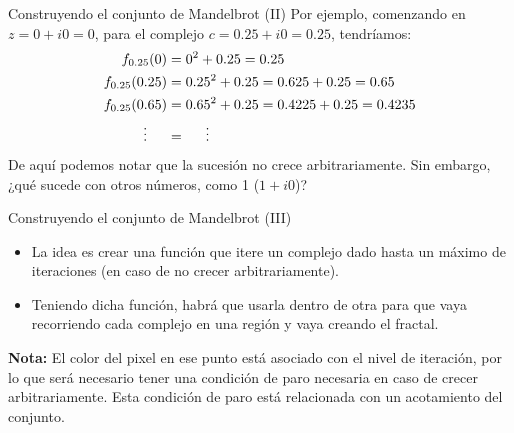 \documentclass[usenames,dvipsnames]{beamer}
\begin{document}
  \begin{frame}{Construyendo el conjunto de Mandelbrot (II)}
    Por ejemplo, comenzando en $z = 0 + i0 = 0$, para el complejo
    $c = 0.25 + i0 = 0.25$, tendríamos:
    \begin{align*}
    f_{0.25}(0) &=  0^2 + 0.25 = 0.25\\
    f_{0.25}(0.25) &=  0.25^2 + 0.25 = 0.625 + 0.25 = 0.65\\
    f_{0.25}(0.65) &=  0.65^2 + 0.25 = 0.4225 + 0.25 = 0.4235\\
    \vdots\hspace*{0.5cm} &= \hspace*{0.5cm}\vdots
    \end{align*}
    De aquí podemos notar que la sucesión no crece arbitrariamente.
    Sin embargo, ¿qué sucede con otros números, como 1 ($1 + i0$)?
  \end{frame}

  \begin{frame}{Construyendo el conjunto de Mandelbrot (III)}
    \begin{itemize}
      \item La idea es crear una función que itere un complejo dado hasta
      un máximo de iteraciones (en caso de no crecer arbitrariamente).\\
      \item Teniendo dicha función, habrá que usarla dentro de otra para que
      vaya recorriendo cada complejo en una región y vaya creando el fractal.\\
    \end{itemize}
    \textbf{Nota:} El color del pixel en ese punto está asociado con el nivel
    de iteración, por lo que será necesario tener una condición de paro
    necesaria en caso de crecer arbitrariamente. Esta condición de paro está
    relacionada con un acotamiento del conjunto.
  \end{frame}
\end{document}
